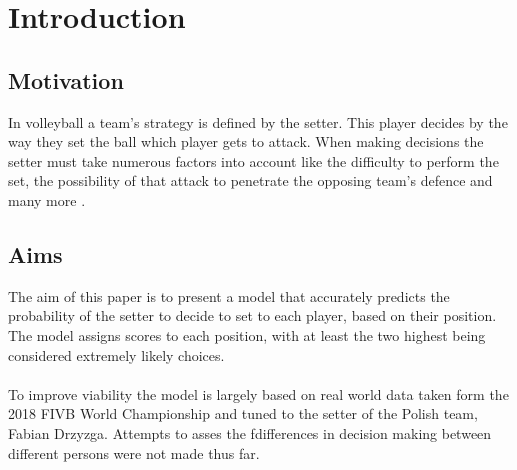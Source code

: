 \documentclass[main.tex]{subfiles}
\begin{document}
  \section{Introduction}
    \subsection{Motivation}
    
      In volleyball a team's strategy is defined by the setter. This player decides by the way they set the ball which player gets to attack. When making decisions the setter must take numerous factors into account like the difficulty to perform the set, the possibility of that attack to penetrate the opposing team's defence and many more \cite{rotation,idealSetter}.

    \subsection{Aims}
  
      The aim of this paper is to present a model that accurately predicts the probability of the setter to decide to set to each player, based on their position. The model assigns scores to each position, with at least the two highest being considered extremely likely choices. 
      \\\\
      To improve viability the model is largely based on real world data taken form the 2018 FIVB World Championship and tuned to the setter of the Polish team, Fabian Drzyzga. Attempts to asses the fdifferences in decision making between different persons were not made thus far.
      
\end{document}
